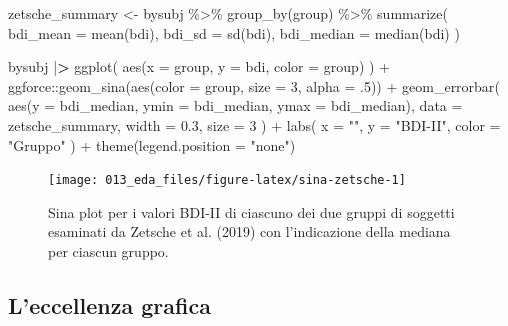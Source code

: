 \documentclass[
  10pt,
  italian,
  a4paper,
  extrafontsizes,onecolumn,openright
  ]{memoir}
\newenvironment{Shaded}{\begin{snugshade}}{\end{snugshade}}
\newcommand{\AttributeTok}[1]{\textcolor[rgb]{0.77,0.63,0.00}{#1}}
\newcommand{\DecValTok}[1]{\textcolor[rgb]{0.00,0.00,0.81}{#1}}
\newcommand{\ErrorTok}[1]{\textcolor[rgb]{0.64,0.00,0.00}{\textbf{#1}}}
\newcommand{\FloatTok}[1]{\textcolor[rgb]{0.00,0.00,0.81}{#1}}
\newcommand{\FunctionTok}[1]{\textcolor[rgb]{0.00,0.00,0.00}{#1}}
\newcommand{\NormalTok}[1]{#1}
\newcommand{\OtherTok}[1]{\textcolor[rgb]{0.56,0.35,0.01}{#1}}
\newcommand{\SpecialCharTok}[1]{\textcolor[rgb]{0.00,0.00,0.00}{#1}}
\newcommand{\StringTok}[1]{\textcolor[rgb]{0.31,0.60,0.02}{#1}}
\theoremstyle{definition}
\theoremstyle{definition}
\theoremstyle{definition}
\theoremstyle{definition}
\theoremstyle{remark}
\begin{document}
\begin{Shaded}
\begin{Highlighting}[]
\NormalTok{zetsche\_summary }\OtherTok{\textless{}{-}}\NormalTok{ bysubj }\SpecialCharTok{\%\textgreater{}\%}
  \FunctionTok{group\_by}\NormalTok{(group) }\SpecialCharTok{\%\textgreater{}\%}
  \FunctionTok{summarize}\NormalTok{(}
    \AttributeTok{bdi\_mean =} \FunctionTok{mean}\NormalTok{(bdi),}
    \AttributeTok{bdi\_sd =} \FunctionTok{sd}\NormalTok{(bdi),}
    \AttributeTok{bdi\_median =} \FunctionTok{median}\NormalTok{(bdi)}
\NormalTok{  )}

\NormalTok{bysubj }\SpecialCharTok{|}\ErrorTok{\textgreater{}}
  \FunctionTok{ggplot}\NormalTok{(}
    \FunctionTok{aes}\NormalTok{(}\AttributeTok{x =}\NormalTok{ group, }\AttributeTok{y =}\NormalTok{ bdi, }\AttributeTok{color =}\NormalTok{ group)}
\NormalTok{  ) }\SpecialCharTok{+}
\NormalTok{  ggforce}\SpecialCharTok{::}\FunctionTok{geom\_sina}\NormalTok{(}\FunctionTok{aes}\NormalTok{(}\AttributeTok{color =}\NormalTok{ group, }\AttributeTok{size =} \DecValTok{3}\NormalTok{, }\AttributeTok{alpha =}\NormalTok{ .}\DecValTok{5}\NormalTok{)) }\SpecialCharTok{+}
  \FunctionTok{geom\_errorbar}\NormalTok{(}
    \FunctionTok{aes}\NormalTok{(}\AttributeTok{y =}\NormalTok{ bdi\_median, }\AttributeTok{ymin =}\NormalTok{ bdi\_median, }\AttributeTok{ymax =}\NormalTok{ bdi\_median),}
    \AttributeTok{data =}\NormalTok{ zetsche\_summary, }\AttributeTok{width =} \FloatTok{0.3}\NormalTok{, }\AttributeTok{size =} \DecValTok{3}
\NormalTok{  ) }\SpecialCharTok{+}
  \FunctionTok{labs}\NormalTok{(}
    \AttributeTok{x =} \StringTok{""}\NormalTok{,}
    \AttributeTok{y =} \StringTok{"BDI{-}II"}\NormalTok{,}
    \AttributeTok{color =} \StringTok{"Gruppo"}
\NormalTok{  ) }\SpecialCharTok{+}
  \FunctionTok{theme}\NormalTok{(}\AttributeTok{legend.position =} \StringTok{"none"}\NormalTok{)}
\end{Highlighting}
\end{Shaded}

\begin{figure}[h]

{\centering \texttt{[image: 013\_eda\_files/figure-latex/sina-zetsche-1]} 

}

\caption{Sina plot per i valori BDI-II di ciascuno dei due gruppi di soggetti esaminati da Zetsche et al. (2019) con l'indicazione della mediana per ciascun gruppo.}\label{fig:sina-zetsche}
\end{figure}

\hypertarget{leccellenza-grafica}{%
\subsection{L'eccellenza grafica}\label{leccellenza-grafica}}
\end{document}
